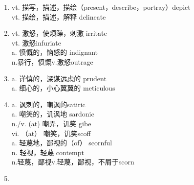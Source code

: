 \documentclass[UTF8]{ctexart}
\begin{document}
\begin{enumerate}
\item vt. 描写，描述，描绘（present，describe，portray）\qquad depict \\ vt. 描绘，描述，解释 \qquad delineate
\item vt. 激怒，使烦躁，刺激 \qquad irritate \\vt. 激怒\qquad  infuriate\\a. 愤慨的，恼怒的 \qquad indignant\\n.暴行，愤慨v.激怒\qquad outrage\\
\item a. 谨慎的，深谋远虑的 \qquad prudent \\ a. 细心的，小心翼翼的 \qquad meticulous \\
\item a. 讽刺的，嘲讽的\qquad satiric \\ a. 嘲笑的，讥讽地 \qquad sardonic \\ n./v. (at) 嘲弄，讥笑 \qquad gibe\\vi. （at） 嘲笑，讥笑\qquad scoff\\ a. 轻蔑地，鄙视的（of） \qquad scornful\\ n. 轻视，轻蔑 \qquad contempt\\n.轻蔑，鄙视v.轻蔑，鄙视，不屑于\qquad scorn\\
\item 
\end{enumerate}
\end{document}
